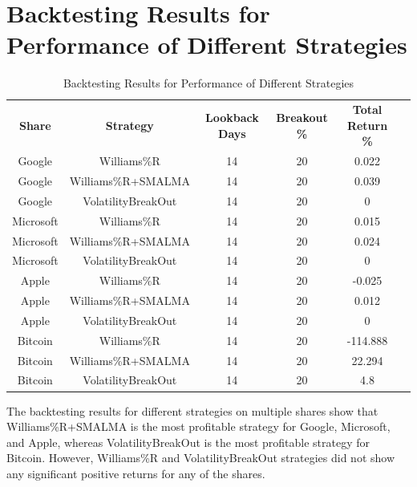\section{Backtesting Results for Performance of Different Strategies}

\begin{table}[htp]
\centering
\caption{Backtesting Results for Performance of Different Strategies}
\label{table:backtesting4}
\begin{tabular}{|c|c|c|c|c|c|}
\hline
\textbf{Share} & \textbf{Strategy} & \textbf{Lookback Days} & \textbf{Breakout \%} & \textbf{Total Return \%} \\


Google & Williams\%R & 14 & 20 & 0.022 \\


Google & Williams\%R+SMALMA & 14 & 20 & 0.039 \\

Google & VolatilityBreakOut & 14 & 20 & 0 \\

Microsoft & Williams\%R & 14 & 20 & 0.015 \\


Microsoft & Williams\%R+SMALMA & 14 & 20 & 0.024 \\

Microsoft & VolatilityBreakOut & 14 & 20 & 0 \\

Apple & Williams\%R & 14 & 20 & -0.025 \\


Apple & Williams\%R+SMALMA & 14 & 20 & 0.012 \\

Apple & VolatilityBreakOut & 14 & 20 & 0 \\

Bitcoin & Williams\%R & 14 & 20 & -114.888 \\


Bitcoin & Williams\%R+SMALMA & 14 & 20 & 22.294 \\

Bitcoin & VolatilityBreakOut & 14 & 20 & 4.8 \\


\hline
\end{tabular}
\end{table}

The backtesting results for different strategies on multiple shares show that Williams\%R+SMALMA is the most profitable strategy for Google, Microsoft, and Apple, whereas VolatilityBreakOut is the most profitable strategy for Bitcoin. However, Williams\%R and VolatilityBreakOut strategies did not show any significant positive returns for any of the shares.
